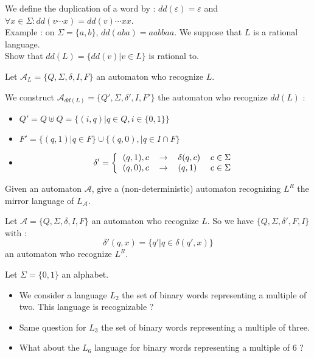\documentclass{article}
\theoremstyle{plain}
\newcommand{\dd}{\textit{dd}}
\begin{document}
  \exercice
  We define the duplication of a word by : $\dd(\varepsilon) =
  \varepsilon$ and $\forall x \in \Sigma : \dd(v\cdots x) = \dd(v) \cdots xx$.
  \\
  Example : on $\Sigma = \{a, b\}$, $\dd(aba) = aabbaa$. We suppose that $L$ is
  a rational language. \\
  Show that $\dd(L) = \{\dd(v) | v \in L\}$ is rational to.

  \begin{correction}{}{}
    Let $\mathcal A_L =\{Q, \Sigma, \delta, I, F\}$ an automaton who recognize
    $L$.

    We construct $\mathcal A_{\dd(L)} = \{Q', \Sigma, \delta', I, F'\}$
    the automaton who recognize $\dd(L)$ :

    \begin{itemize}
      \item $Q' = Q \uplus Q = \{(i, q) | q \in Q, i \in \{0, 1\}\}$
      \item $F' = \{(q, 1) | q \in F\} \cup \{(q, 0),| q \in I \cap F\}$
      \item
        \[
        \delta' = \left \{
          \begin{tabular}{l l l r}
            $(q, 1), c$ & $\to$ & $\delta(q, c)$ & $c \in \Sigma$ \\
            $(q, 0), c$ & $\to$ & $(q, 1)$ & $c \in \Sigma$
          \end{tabular}
          \right.
      \]
    \end{itemize}
  \end{correction}

  \exercice Given an automaton $\mathcal A$, give a (non-deterministic)
  automaton recognizing $L^R$ the mirror language of $L_{\mathcal A}$.

  \begin{correction}{}{}
    Let $\mathcal A = \{Q, \Sigma, \delta, I, F\}$ an automaton who recognize
    $L$. So we have $\{Q, \Sigma, \delta', F, I\}$ with :
    $$\delta'(q, x) = \{q' | q \in \delta(q', x)\}$$
    an automaton who recognize $L^R$.
  \end{correction}

  \exercice Let $\Sigma = \{0, 1\}$ an alphabet.

    \begin{itemize}
      \item We consider a language $L_2$ the set of binary words representing a
        multiple of two. This language is recognizable ?

      \item Same question for $L_3$ the set of binary words representing a
        multiple of three.

      \item What about the $L_6$ language for binary words representing a
        multiple of 6 ?
    \end{itemize}
\end{document}
